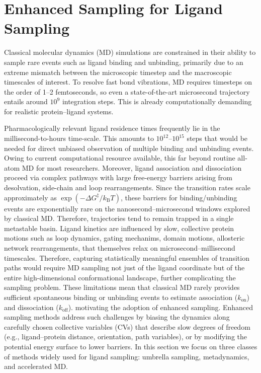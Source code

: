 \documentclass[12pt]{article}
\begin{document}
\section{Enhanced Sampling for Ligand Sampling}

Classical molecular dynamics (MD) simulations are constrained in their ability to sample rare events such as ligand binding and unbinding, primarily due to an extreme mismatch between the microscopic timestep and the macroscopic timescales of interest.  To resolve fast bond vibrations, MD requires timesteps on the order of 1--2 femtoseconds, so even a state-of-the-art microsecond trajectory entails around $10^9$ integration steps. This is already computationally demanding for realistic protein--ligand systems. 

Pharmacologically relevant ligand residence times frequently lie in the millisecond-to-hours time-scale. This amounts to $10^{12}$--$10^{15}$ steps that would be needed for direct unbiased observation of multiple binding and unbinding events\cite{CH9_miao2020ligand,CH9_ahmad2022enhanced}. Owing to current computational resource available, this far beyond routine all-atom MD for most researchers. Moreover, ligand association and dissociation proceed via complex pathways with large free-energy barriers arising from desolvation, side-chain and loop rearrangements. Since the transition rates scale approximately as $\exp(-\Delta G^{\ddagger}/k_{\mathrm{B}}T)$, these barriers for binding/unbinding events are exponentially rare on the nanosecond--microsecond windows explored by classical MD. Therefore, trajectories tend to remain trapped in a single metastable basin. Ligand kinetics are influenced by slow, collective protein motions such as loop dynamics, gating mechanims, domain motions, allosteric network rearrangements, that themselves relax on microsecond--millisecond timescales. Therefore, capturing statistically meaningful ensembles of transition paths would require MD sampling not just of the ligand coordinate but of the entire high-dimensional conformational landscape, further complicating the sampling problem. These limitations mean that classical MD rarely provides sufficient spontaneous binding or unbinding events to estimate association ($k_{\textrm{on}}$) and dissociation ($k_{\textrm{off}}$).  motivating the adoption of enhanced sampling. Enhanced sampling methods address such challenges by biasing the dynamics along carefully chosen collective variables (CVs) that describe slow degrees of freedom (e.g., ligand--protein distance, orientation, path variables), or by modifying the potential energy surface to lower barriers.\cite{CH9_LaioParrinello2002,CH9_Barducci2008,CH9_Hamelberg2004} In this section we focus on three classes of methods widely used for ligand sampling: umbrella sampling, metadynamics, and accelerated MD.
\end{document}
